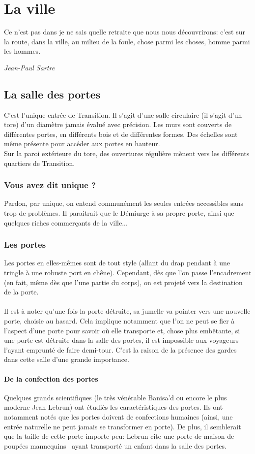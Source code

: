 \documentclass{book}
\begin{document}
\chapter{La ville}
\epigraph{Ce n'est pas dans je ne sais quelle retraite que nous nous découvrirons: c'est sur la route, dans la ville, au milieu de la foule, chose parmi les choses, homme parmi les hommes.}{\textit{Jean-Paul Sartre}}
\section{La salle des portes}

C'est l'unique entrée de Transition. Il s'agit d'une salle circulaire (il s'agit d'un tore) d'un diamètre jamais évalué avec précision. Les murs sont couverts de différentes portes, en différents bois et de différentes formes. Des échelles sont même présente pour accéder aux portes en hauteur.\\
Sur la paroi extérieure du tore, des ouvertures régulière mènent vers les différents quartiers de Transition.

\subsection{Vous avez dit unique ?}
Pardon, par unique, on entend communément les seules entrées accessibles sans trop de problèmes. Il paraitrait que le Démiurge à sa propre porte, ainsi que quelques riches commerçants de la ville...

\subsection{Les portes}
Les portes en elles-mêmes sont de tout style (allant du drap pendant à une tringle à une robuste port en chêne). Cependant, dès que l'on passe l'encadrement (en fait, même dès que l'une partie du corps), on est projeté vers la destination de la porte.
\\
\\
Il est à noter qu'une fois la porte détruite, sa jumelle va pointer vers une nouvelle porte, choisie au hasard. Cela implique notamment que l'on ne peut se fier à l'aspect d'une porte pour savoir où elle transporte et, chose plus embêtante, si une porte est détruite dans la salle des portes, il est impossible aux voyageurs l'ayant emprunté de faire demi-tour. C'est la raison de la présence des gardes dans cette salle d'une grande importance.

\subsubsection{De la confection des portes}
Quelques grands scientifiques (le très vénérable Banisa'd ou encore le plus moderne Jean Lebrun) ont étudiés les caractéristiques des portes. Ils ont notamment notés que les portes doivent de confections humaines (ainsi, une entrée naturelle ne peut jamais se transformer en porte). De plus, il semblerait que la taille de cette porte importe peu: Lebrun cite une \guillemotleft porte de maison de poupées mannequins \guillemotright \ ayant transporté un enfant dans la salle des portes.
\end{document}

